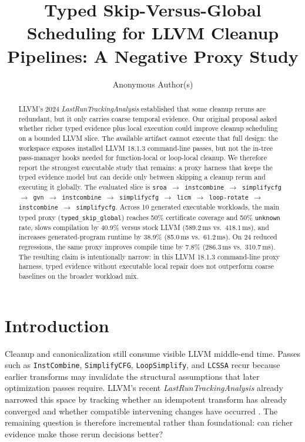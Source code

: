 \documentclass{article}
\title{Typed Skip-Versus-Global Scheduling for LLVM Cleanup Pipelines: A Negative Proxy Study}
\author{
  Anonymous Author(s)
}
\begin{document}
\maketitle

\begin{abstract}
LLVM's 2024 \emph{LastRunTrackingAnalysis} established that some cleanup reruns are redundant, but it only carries coarse temporal evidence. Our original proposal asked whether richer typed evidence plus local execution could improve cleanup scheduling on a bounded LLVM slice. The available artifact cannot execute that full design: the workspace exposes installed LLVM 18.1.3 command-line passes, but not the in-tree pass-manager hooks needed for function-local or loop-local cleanup. We therefore report the strongest executable study that remains: a proxy harness that keeps the typed evidence model but can decide only between skipping a cleanup rerun and executing it globally. The evaluated slice is \texttt{sroa $\rightarrow$ instcombine $\rightarrow$ simplifycfg $\rightarrow$ gvn $\rightarrow$ instcombine $\rightarrow$ simplifycfg $\rightarrow$ licm $\rightarrow$ loop-rotate $\rightarrow$ instcombine $\rightarrow$ simplifycfg}. Across 10 generated executable workloads, the main typed proxy (\texttt{typed\_skip\_global}) reaches 50\% certificate coverage and 50\% \texttt{unknown} rate, slows compilation by 40.9\% versus stock LLVM (589.2\,ms vs.\ 418.1\,ms), and increases generated-program runtime by 38.9\% (85.0\,ms vs.\ 61.2\,ms). On 24 reduced regressions, the same proxy improves compile time by 7.8\% (286.3\,ms vs.\ 310.7\,ms). The resulting claim is intentionally narrow: in this LLVM 18.1.3 command-line proxy harness, typed evidence without executable local repair does not outperform coarse baselines on the broader workload mix.
\end{abstract}

\section{Introduction}

Cleanup and canonicalization still consume visible LLVM middle-end time. Passes such as \texttt{InstCombine}, \texttt{SimplifyCFG}, \texttt{LoopSimplify}, and \texttt{LCSSA} recur because earlier transforms may invalidate the structural assumptions that later optimization passes require. LLVM's recent \emph{LastRunTrackingAnalysis} already narrowed this space by tracking whether an idempotent transform has already converged and whether compatible intervening changes have occurred \citep{zheng2024lastrun}. The remaining question is therefore incremental rather than foundational: can richer evidence make those rerun decisions better?
\end{document}
